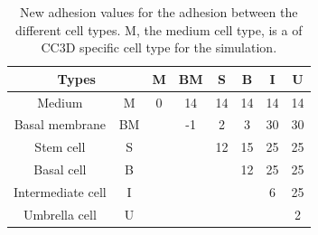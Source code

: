 \begin{table}[ht]
\centering
\caption[New adhesion values for the different cell types]{New adhesion values for the adhesion between the different cell types. M, the medium cell type, is a of \ac{CC3D} specific cell type for the simulation.\newline}
\renewcommand{\arraystretch}{1.5}
	\begin{tabular}{|c|c||c|c|c|c|c|c|}
	\hline
		\multicolumn{2}{|c||}{Types} & M & BM & S & B & I & U \\
		\hline
		\hline
		
		Medium & M & 0 & 14 & 14 & 14 & 14 & 14 \\
		\hline
		Basal membrane & BM & & -1 & 2 & 3 & 30 & 30 \\
		\hline
		Stem cell & S & & & 12 & 15 & 25 & 25 \\
		\hline
		Basal cell & B & & & & 12 & 25 & 25 \\
		\hline
		Intermediate cell & I & & & & & 6 & 25 \\
		\hline
		Umbrella cell & U & & & & & & 2
\tabularnewline
\hline 
	\end{tabular}
	\label{tbl:NewAdhesion}
\end{table}


